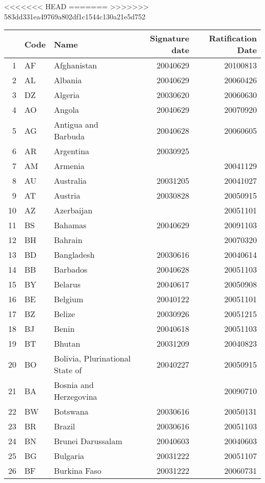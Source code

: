 <<<<<<< HEAD
=======
>>>>>>> 583dd331ea49769a802df1c1544c130a21e5d752
\begin{longtable}{rllrr}
  \toprule
 & Code & Name & Signature date & Ratification Date \\ 
  \midrule
1 & AF & Afghanistan & 20040629 & 20100813 \\ 
  2 & AL & Albania & 20040629 & 20060426 \\ 
  3 & DZ & Algeria & 20030620 & 20060630 \\ 
  4 & AO & Angola & 20040629 & 20070920 \\ 
  5 & AG & Antigua and Barbuda & 20040628 & 20060605 \\ 
  6 & AR & Argentina & 20030925 &  \\ 
  7 & AM & Armenia &  & 20041129 \\ 
  8 & AU & Australia & 20031205 & 20041027 \\ 
  9 & AT & Austria & 20030828 & 20050915 \\ 
  10 & AZ & Azerbaijan &  & 20051101 \\ 
  11 & BS & Bahamas & 20040629 & 20091103 \\ 
  12 & BH & Bahrain &  & 20070320 \\ 
  13 & BD & Bangladesh & 20030616 & 20040614 \\ 
  14 & BB & Barbados & 20040628 & 20051103 \\ 
  15 & BY & Belarus & 20040617 & 20050908 \\ 
  16 & BE & Belgium & 20040122 & 20051101 \\ 
  17 & BZ & Belize & 20030926 & 20051215 \\ 
  18 & BJ & Benin & 20040618 & 20051103 \\ 
  19 & BT & Bhutan & 20031209 & 20040823 \\ 
  20 & BO & Bolivia, Plurinational State of & 20040227 & 20050915 \\ 
  21 & BA & Bosnia and Herzegovina &  & 20090710 \\ 
  22 & BW & Botswana & 20030616 & 20050131 \\ 
  23 & BR & Brazil & 20030616 & 20051103 \\ 
  24 & BN & Brunei Darussalam & 20040603 & 20040603 \\ 
  25 & BG & Bulgaria & 20031222 & 20051107 \\ 
  26 & BF & Burkina Faso & 20031222 & 20060731 \\ 

\end{longtable}
